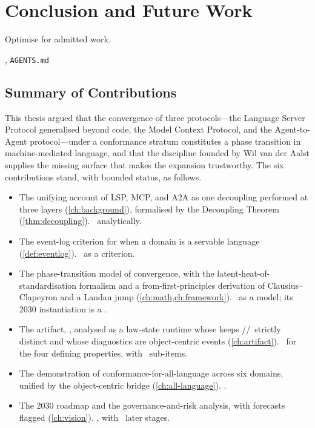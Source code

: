 \chapter{Conclusion and Future Work}
\label{ch:conclusion}

\epigraph{Optimise for admitted work.}{\textit{\lspmax}, \texttt{AGENTS.md}}

\section{Summary of Contributions}
\label{sec:conc-summary}

This thesis argued that the convergence of three protocols---the Language Server
Protocol generalised beyond code, the Model Context Protocol, and the
Agent-to-Agent protocol---under a conformance stratum constitutes a phase
transition in machine-mediated language, and that the discipline founded by Wil van
der Aalst supplies the missing surface that makes the expansion trustworthy. The
six contributions stand, with bounded status, as follows.

\begin{itemize}[leftmargin=2.2em]
  \item[\textbf{C1}] The unifying account of LSP, MCP, and A2A as one decoupling
  performed at three layers (\cref{ch:background}), formalised by the Decoupling
  Theorem (\cref{thm:decoupling}). \admitted\ analytically.
  \item[\textbf{C2}] The event-log criterion for when a domain is a servable
  language (\cref{def:eventlog}). \admitted\ as a criterion.
  \item[\textbf{C3}] The phase-transition model of convergence, with the
  latent-heat-of-standardisation formalism and a from-first-principles derivation of
  Clausius--Clapeyron and a Landau jump (\cref{ch:math,ch:framework}). \admitted\ as
  a model; its 2030 instantiation is a \forecast.
  \item[\textbf{C4}] The artifact, \lspmax, analysed as a law-state runtime whose
   keeps \admitted//\unknownstat\ strictly distinct
  and whose diagnostics are object-centric events (\cref{ch:artifact}). \admitted\
  for the four defining properties, with \openstat\ sub-items.
  \item[\textbf{C5}] The demonstration of conformance-for-all-language across six
  domains, unified by the object-centric bridge (\cref{ch:all-language}).
  \candidate.
  \item[\textbf{C6}] The 2030 roadmap and the governance-and-risk analysis, with
  forecasts flagged (\cref{ch:vision}). \candidate, with \openstat\ later stages.
\end{itemize}

